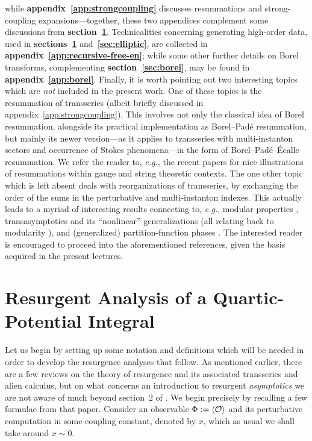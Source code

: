 \documentclass[11pt,a4paper]{article}
\newcommand{\CO}{{\cal O}}
\begin{document}
while \textbf{appendix~\ref{app:strongcoupling}} discusses resummations and strong-coupling expansions---together, these two appendices complement some discussions from \textbf{section~\ref{sec:quartic}}. Technicalities concerning generating high-order data, used in \textbf{sections~\ref{sec:quartic}} and~\textbf{\ref{sec:elliptic}}, are collected in \textbf{appendix~\ref{app:recursive-free-en}}; while some other further details on Borel transforms, complementing \textbf{section~\ref{sec:borel}}, may be found in \textbf{appendix~\ref{app:borel}}. Finally, it is worth pointing out two interesting topics which are \textit{not} included in the present work. One of these topics is the resummation of transseries (albeit briefly discussed in appendix~\ref{app:strongcoupling}). This involves not only the classical idea of Borel resummation, alongside its practical implementation as Borel--Pad\'e resummation, but mainly its newer version---as it applies to transseries with multi-instanton sectors and occurrence of Stokes phenomena---in the form of Borel--Pad\'e--\'Ecalle resummation. We refer the reader to, \textit{e.g.}, the recent papers \cite{m08, gmz14, csv15, a15, cms16, cms17, c1712} for nice illustrations of resummations within gauge and string theoretic contexts. The one other topic which is left absent deals with reorganizations of transseries, by exchanging the order of the sums in the perturbative and multi-instanton indexes. This actually leads to a myriad of interesting results connecting to, \textit{e.g.}, modular properties \cite{bde00, b_e08, em08, mpp09, asv18a, asv18b}, transasymptotics \cite{cc01, cch13} and its ``nonlinear'' generalizations \cite{asv18a, asv18b} (all relating back to modularity \cite{bde00, b_e08, em08}), and (generalized) partition-function phases \cite{asv18a, asv18b}. The interested reader is encouraged to proceed into the aforementioned references, given the basis acquired in the present lectures.


\section{Resurgent Analysis of a Quartic-Potential Integral}\label{sec:quartic}


Let us begin by setting up some notation and definitions which will be needed in order to develop the resurgence analyses that follow. As mentioned earlier, there are a few reviews on the theory of resurgence and its associated transseries and alien calculus, but on what concerns an introduction to resurgent \textit{asymptotics} we are not aware of much beyond section~2 of \cite{asv11}. We begin precisely by recalling a few formulae from that paper. Consider an observable $\Phi := \langle \CO \rangle$ and its perturbative computation in some coupling constant, denoted by $x$, which as usual we shall take around $x \sim 0$.
\end{document}
